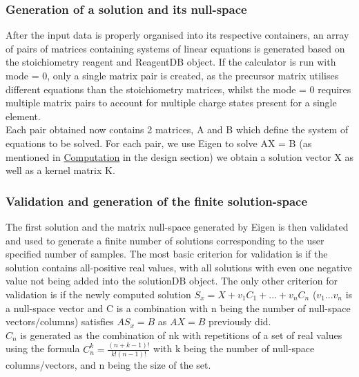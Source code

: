 
\subsubsection{Generation of a solution and its null-space}
After the input data is properly organised into its respective containers, an array of pairs of matrices containing systems of linear equations is generated based on the stoichiometry reagent and ReagentDB object. If the calculator is run with mode = 0, only a single matrix pair is created, as the precursor matrix utilises different equations than the stoichiometry matrices, whilst the mode = 0 requires multiple matrix pairs to account for multiple charge states present for a single element. \\

Each pair obtained now contains 2 matrices, A and B which define the system of equations to be solved. For each pair, we use Eigen to solve AX = B (as mentioned in \href{section:computation}{Computation} in the design section)  we obtain a solution vector X as well as a kernel matrix K. \\

\subsubsection{Validation and generation of the finite solution-space}
The first solution and the matrix null-space generated by Eigen \cite{eigen} is then validated and used to generate a finite number of solutions corresponding to the user specified number of samples. The most basic criterion for validation is if the solution contains all-positive real values, with all solutions with even one negative value not being added into the solutionDB object. The only other criterion for validation is if the newly computed solution $S_{x} = X + v_{1}C_{1} + ... + v_{n}C_{n}$ ($v_{1} ... v_{n}$ is a null-space vector and C is a combination with n being the number of null-space vectors/columns) satisfies $AS_{x} = B$ as $AX = B$ previously did. \\

$C_{n}$ is generated as the combination of nk with repetitions of a set of real values using the formula $C_{n}^{k}=\frac{(n+k-1)!}{k!(n-1)!}$ with k being the number of null-space columns/vectors, and n being the size of the set. 

